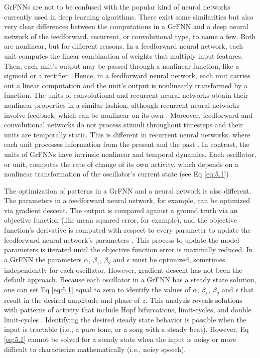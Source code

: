 \documentclass{report}
\begin{document}
GrFNNs are not to be confused with the popular kind of neural networks currently used in deep learning algorithms. There exist some similarities but also very clear differences between the computations in a GrFNN and a deep neural network of the feedforward, recurrent, or convolutional type, to name a few. Both are nonlinear, but for different reasons. In a feedforward neural network, each unit computes the linear combination of weights that multiply input features. Then, each unit's output may be passed through a nonlinear function, like a sigmoid or a rectifier \cite{svozil1997introduction}. Hence, in a feedforward neural network, each unit carries out a linear computation and the unit's output is nonlinearly transformed by a function. The units of convolutional and recurrent neural networks obtain their nonlinear properties in a similar fashion, although recurrent neural networks involve feedback, which can be nonlinear on its own \cite{le2015tutorial2}. Moreover, feedforward and convolutional networks do not process stimuli throughout timesteps and their units are temporally static. This is different in recurrent neural networks, where each unit processes information from the present and the past \cite{le2015tutorial2}. In contrast, the units of GrFNNs have intrinsic nonlinear and temporal dynamics. Each oscillator, or unit, computes the rate of change of its own activity, which depends on a nonlinear transformation of the oscillator's current state (see Eq \eqref{eq:5.1}) \cite{large2010canonical}. 

The optimization of patterns in a GrFNN and a neural network is also different. The parameters in a feedforward neural network, for example, can be optimized via gradient descent. The output is compared against a ground truth via an objective function (like mean squared error, for example), and the objective function's derivative is computed with respect to every parameter to update the feedforward neural network's parameters \cite{le2015tutorial1}. This process to update the model parameters is iterated until the objective function error is maximally reduced. In a GrFNN the parameters $\alpha$, $\beta_1$, $\beta_2$ and $\epsilon$ must be optimized, sometimes independently for each oscillator. However, gradient descent has not been the default approach. Because each oscillator in a GrFNN has a steady state solution, one can set Eq \eqref{eq:5.1} equal to zero to identify the values of $\alpha$, $\beta_1$, $\beta_2$ and $\epsilon$ that result in the desired amplitude and phase of $z$. This analysis reveals solutions with patterns of activity that include Hopf bifurcations, limit-cycles, and double limit-cycles \cite{kim2015signal}. Identifying the desired steady state behavior is possible when the input is tractable (i.e., a pure tone, or a song with a steady beat). However, Eq \eqref{eq:5.1} cannot be solved for a steady state when the input is noisy or more difficult to characterize mathematically (i.e., noisy speech). 
\end{document}
